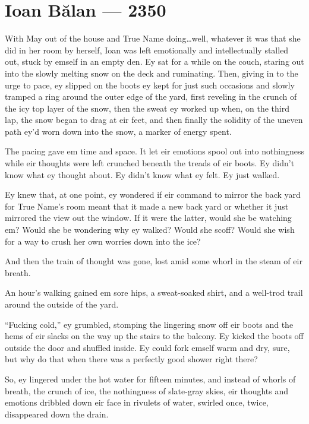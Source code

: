 \hypertarget{ioan-bux103lan-2350}{%
\chapter{Ioan Bălan — 2350}\label{ioan-bux103lan-2350}}

With May out of the house and True Name doing\ldots well, whatever it was that she did in her room by herself, Ioan was left emotionally and intellectually stalled out, stuck by emself in an empty den. Ey sat for a while on the couch, staring out into the slowly melting snow on the deck and ruminating. Then, giving in to the urge to pace, ey slipped on the boots ey kept for just such occasions and slowly tramped a ring around the outer edge of the yard, first reveling in the crunch of the icy top layer of the snow, then the sweat ey worked up when, on the third lap, the snow began to drag at eir feet, and then finally the solidity of the uneven path ey'd worn down into the snow, a marker of energy spent.

The pacing gave em time and space. It let eir emotions spool out into nothingness while eir thoughts were left crunched beneath the treads of eir boots. Ey didn't know what ey thought about. Ey didn't know what ey felt. Ey just walked.

Ey knew that, at one point, ey wondered if eir command to mirror the back yard for True Name's room meant that it made a new back yard or whether it just mirrored the view out the window. If it were the latter, would she be watching em? Would she be wondering why ey walked? Would she scoff? Would she wish for a way to crush her own worries down into the ice?

And then the train of thought was gone, lost amid some whorl in the steam of eir breath.

An hour's walking gained em sore hips, a sweat-soaked shirt, and a well-trod trail around the outside of the yard.

``Fucking cold,'' ey grumbled, stomping the lingering snow off eir boots and the hems of eir slacks on the way up the stairs to the balcony. Ey kicked the boots off outside the door and shuffled inside. Ey could fork emself warm and dry, sure, but why do that when there was a perfectly good shower right there?

So, ey lingered under the hot water for fifteen minutes, and instead of whorls of breath, the crunch of ice, the nothingness of slate-gray skies, eir thoughts and emotions dribbled down eir face in rivulets of water, swirled once, twice, disappeared down the drain.

